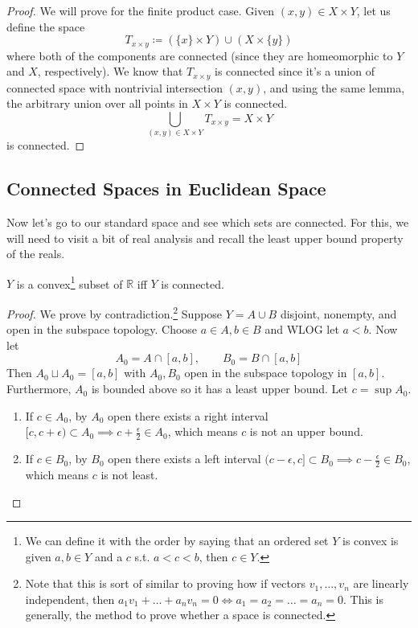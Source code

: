   \begin{proof}
    We will prove for the finite product case. Given $(x, y) \in X \times Y$, let us define the space 
    \begin{equation}
      T_{x \times y} \coloneqq (\{x\} \times Y) \cup (X \times \{y\})
    \end{equation}
    where both of the components are connected (since they are homeomorphic to $Y$ and $X$, respectively). We know that $T_{x \times y}$ is connected since it's a union of connected space with nontrivial intersection $(x, y)$, and using the same lemma, the arbitrary union over all points in $X \times Y$ is connected. 
    \begin{equation}
      \bigcup_{(x, y) \in X \times Y} T_{x \times y} = X \times Y
    \end{equation}
    is connected. 
  \end{proof}

\subsection{Connected Spaces in Euclidean Space} 

  Now let's go to our standard space and see which sets are connected. For this, we will need to visit a bit of real analysis and recall the least upper bound property of the reals.  

  \begin{theorem}
    $Y$ is a convex\footnote{We can define it with the order by saying that an ordered set $Y$ is convex is given $a, b \in Y$ and a $c$ s.t. $a < c < b$, then $c \in Y$.} subset of $\mathbb{R}$ iff $Y$ is connected. 
  \end{theorem}
  \begin{proof}
    We prove by contradiction.\footnote{Note that this is sort of similar to proving how if vectors $v_1, \ldots, v_n$ are linearly independent, then $a_1 v_1 + \ldots + a_n v_n = 0 \iff a_1 = a_2 = \ldots = a_n = 0$. This is generally, the method to prove whether a space is connected.} Suppose $Y = A \cup B$ disjoint, nonempty, and open in the subspace topology. Choose $a \in A, b \in B$ and WLOG let $a < b$. Now let 
    \begin{equation}
      A_0 = A \cap [a, b], \qquad B_0 = B \cap [a, b]
    \end{equation}
    Then $A_0 \sqcup A_0 = [a, b]$ with $A_0, B_0$ open in the subspace topology in $[a, b]$. Furthermore, $A_0$ is bounded above so it has a least upper bound. Let $c = \sup{A_0}$. 
    \begin{enumerate}
      \item If $c \in A_0$, by $A_0$ open there exists a right interval $[c, c + \epsilon) \subset A_0 \implies c + \frac{\epsilon}{2} \in A_0$, which means $c$ is not an upper bound. 
      \item If $c \in B_0$, by $B_0$ open there exists a left interval $(c - \epsilon, c] \subset B_0 \implies c - \frac{\epsilon}{2} \in B_0 $, which means $c$ is not least. 
    \end{enumerate}
  \end{proof}


